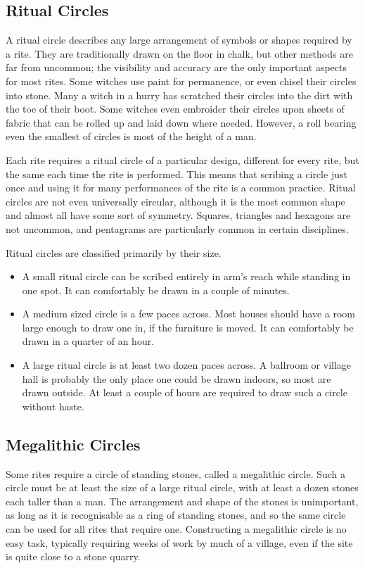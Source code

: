 \subsection{Ritual Circles}

A ritual circle describes any large arrangement of symbols or shapes required by a rite.
They are traditionally drawn on the floor in chalk, but other methods are far from uncommon; the visibility and accuracy are the only important aspects for most rites.
Some witches use paint for permanence, or even chisel their circles into stone.
Many a witch in a hurry has scratched their circles into the dirt with the toe of their boot.
Some witches even embroider their circles upon sheets of fabric that can be rolled up and laid down where needed.
However, a roll bearing even the smallest of circles is most of the height of a man.

Each rite requires a ritual circle of a particular design, different for every rite, but the same each time the rite is performed.
This means that scribing a circle just once and using it for many performances of the rite is a common practice.
Ritual circles are not even universally circular, although it is the most common shape and almost all have some sort of symmetry.
Squares, triangles and hexagons are not uncommon, and pentagrams are particularly common in certain disciplines.

Ritual circles are classified primarily by their size.
\begin{itemize}
	\item A small ritual circle can be scribed entirely in arm's reach while standing in one spot.
		It can comfortably be drawn in a couple of minutes.
	\item A medium sized circle is a few paces across.
		Most houses should have a room large enough to draw one in, if the furniture is moved.
		It can comfortably be drawn in a quarter of an hour.
	\item A large ritual circle is at least two dozen paces across.
		A ballroom or village hall is probably the only place one could be drawn indoors, so most are drawn outside.
		At least a couple of hours are required to draw such a circle without haste.
\end{itemize}

\subsection{Megalithic Circles}

Some rites require a circle of standing stones, called a megalithic circle.
Such a circle must be at least the size of a large ritual circle, with at least a dozen stones each taller than a man.
The arrangement and shape of the stones is unimportant, as long as it is recognisable as a ring of standing stones, and so the same circle can be used for all rites that require one.
Constructing a megalithic circle is no easy task, typically requiring weeks of work by much of a village, even if the site is quite close to a stone quarry.


